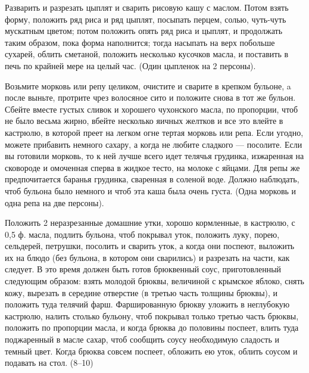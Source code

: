 
Разварить и разрезать цыплят и сварить рисовую кашу с маслом. Потом взять форму, положить ряд риса и ряд цыплят, посыпать перцем, солью, чуть-чуть мускатным цветом; потом положить опять ряд риса и цыплят, и продолжать таким образом, пока форма наполнится; тогда насыпать на верх побольше сухарей, облить сметаной, положить несколько кусочков масла, и поставить в печь по крайней мере на целый час. (Один цыпленок на 2 персоны). 


Возьмите морковь или репу целиком, очистите и сварите в крепком бульоне, a после выньте, протрите чрез волосяное сито и положите снова в тот же бульон. Сбейте вместе густых сливок и хорошего чухонского масла, по пропорции, чтоб не было весьма жирно, вбейте несколько яичных желтков и все это влейте в кастрюлю, в которой преет на легком огне тертая морковь или репа. Если угодно, можете прибавить немного сахару, а когда не любите сладкого — посолите. Если вы готовили морковь, то к ней лучше всего идет телячья грудинка, изжаренная на сковороде и омоченная сперва в жидкое тесто, на молоке с яйцами. Для репы же предпочитается баранья грудинка, сваренная в соленой воде. Должно наблюдать, чтоб бульона было немного и чтоб эта каша была очень густа. (Одна морковь и одна репа на две персоны). 


Положить 2 неразрезанные домашние утки, хорошо кормленные, в кастрюлю, с 0,5 ф. масла, подлить бульона, чтоб покрывал уток, положить луку, порею, сельдерей, петрушки, посолить и сварить уток, а когда они поспеют, выложить их на блюдо (без бульона, в котором они сварились) и разрезать на части, как следует. В это время должен быть готов брюквенный соус, приготовленный следующим образом: взять молодой брюквы, величиной с крымское яблоко, снять кожу, вырезать в середине отверстие (в третью часть толщины брюквы), и положить туда телячий фарш. Фаршированную брюкву уложить в неглубокую кастрюлю, налить столько бульону, чтоб покрывал только третью часть брюквы, положить по пропорции масла, и когда брюква до половины поспеет, влить туда поджаренный в масле сахар, чтоб сообщить соусу необходимую сладость и темный цвет. Когда брюква совсем поспеет, обложить ею уток, облить соусом и подавать на стол. (8--10) 



